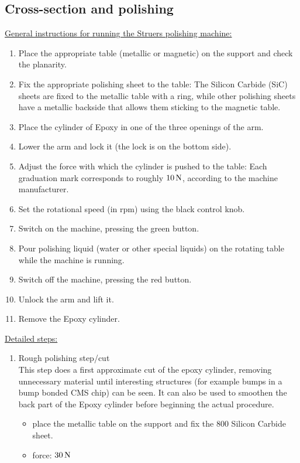 \begin{appendices}
\subsection*{Cross-section and polishing}

\underline{General instructions for running the Struers polishing machine:}
\begin{enumerate}
\item Place the appropriate table (metallic or magnetic) on the support and check the planarity.
\item Fix the appropriate polishing sheet to the table: The Silicon Carbide (SiC) sheets are fixed to the metallic table with a ring, while other polishing sheets have a metallic backside that allows them sticking to the magnetic table.
\item Place the cylinder of Epoxy in one of the three openings of the arm.
\item Lower the arm and lock it (the lock is on the bottom side).
\item Adjust the force with which the cylinder is pushed to the table: Each graduation mark corresponds to roughly $10\,\rm{N}$, according to the machine manufacturer.
\item Set the rotational speed (in rpm) using the black control knob.
\item Switch on the machine, pressing the green button.
\item Pour polishing liquid (water or other special liquids) on the rotating table while the machine is running.
\item Switch off the machine, pressing the red button.
\item Unlock the arm and lift it.
\item Remove the Epoxy cylinder.
\end{enumerate}
\underline{Detailed steps:}
\begin{enumerate}
\item Rough polishing step/cut\\
This step does a first approximate cut of the epoxy cylinder, removing unnecessary material until interesting structures (for example bumps in a bump bonded \ac{CMS} chip) can be seen. It can also be used to smoothen the back part of the Epoxy cylinder before beginning the actual procedure.
\begin{itemize}
\item place the metallic table on the support and fix the 800 Silicon Carbide sheet.
\item force: $30\,\rm{N}$ 

\end{itemize}
\end{enumerate}
\end{appendices}
